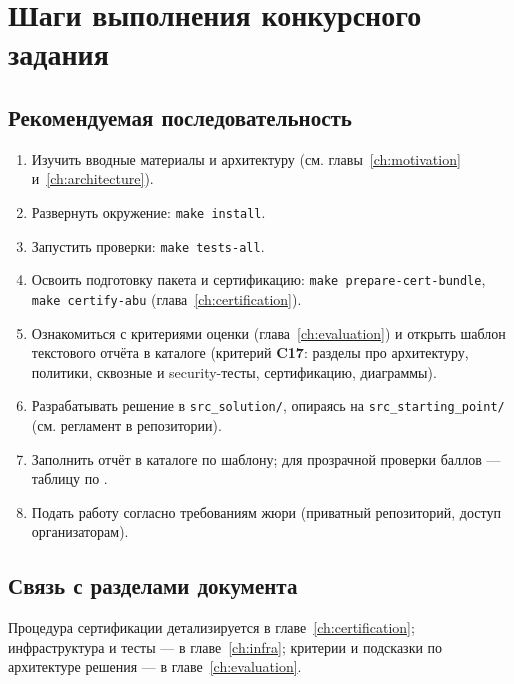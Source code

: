 \chapter{Шаги выполнения конкурсного задания}
\label{ch:steps}

\section{Рекомендуемая последовательность}

\begin{enumerate}
  \item Изучить вводные материалы и архитектуру (см. главы~\ref{ch:motivation} и~\ref{ch:architecture}).
  \item Развернуть окружение: \texttt{make install}.
  \item Запустить проверки: \texttt{make tests-all}.
  \item Освоить подготовку пакета и сертификацию: \texttt{make prepare-cert-bundle}, \texttt{make certify-abu} (глава~\ref{ch:certification}).
  \item Ознакомиться с критериями оценки (глава~\ref{ch:evaluation}) и открыть шаблон текстового отчёта в каталоге  (критерий \textbf{C17}: разделы про архитектуру, политики, сквозные и security-тесты, сертификацию, диаграммы).
  \item Разрабатывать решение в \texttt{src\_solution/}, опираясь на \texttt{src\_starting\_point/} (см. регламент в репозитории).
  \item Заполнить отчёт в каталоге  по шаблону; для прозрачной проверки баллов --- таблицу по .
  \item Подать работу согласно требованиям жюри (приватный репозиторий, доступ организаторам).
\end{enumerate}

\section{Связь с разделами документа}

Процедура сертификации детализируется в главе~\ref{ch:certification}; инфраструктура и тесты --- в главе~\ref{ch:infra}; критерии и подсказки по архитектуре решения --- в главе~\ref{ch:evaluation}.
